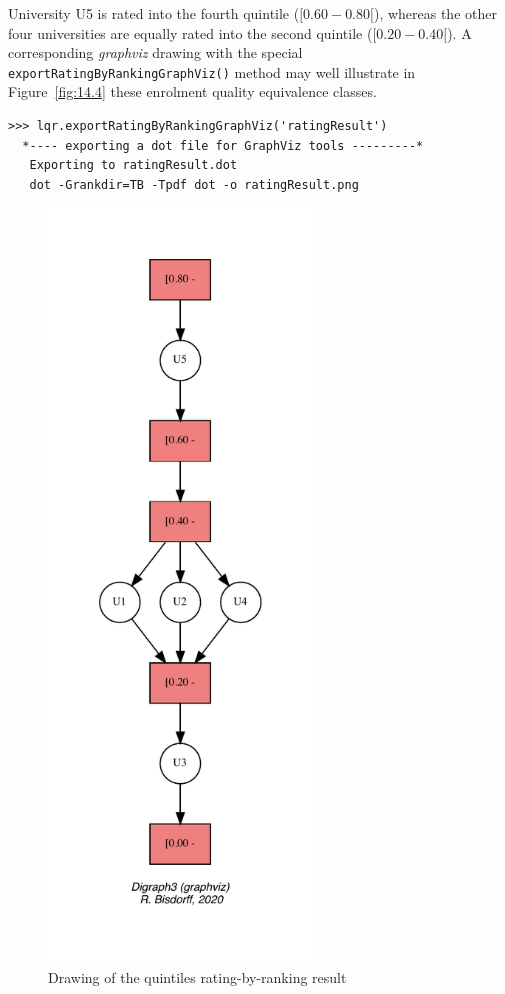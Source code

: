 University U5 is rated into the fourth quintile ($[0.60 - 0.80[$), whereas the other four universities are equally rated into the second quintile ($[0.20 - 0.40[$). A corresponding \emph{graphviz} drawing with the special \texttt{exportRatingByRankingGraph\-Viz()} method may well illustrate in Figure~\vref{fig:14.4} these enrolment quality equivalence classes.
\begin{lstlisting}
>>> lqr.exportRatingByRankingGraphViz('ratingResult')
  *---- exporting a dot file for GraphViz tools ---------*
   Exporting to ratingResult.dot
   dot -Grankdir=TB -Tpdf dot -o ratingResult.png
\end{lstlisting}
\begin{figure}[ht]
\sidecaption[t]
\includegraphics[width=7cm]{Figures/14-4-ratingResult.pdf}
\caption{Drawing of the quintiles rating-by-ranking result}
\label{fig:14.4}       %
\end{figure}

